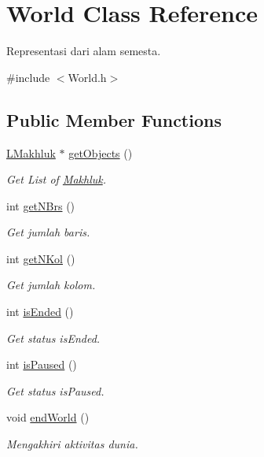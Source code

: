 \hypertarget{class_world}{}\section{World Class Reference}
\label{class_world}


Representasi dari alam semesta.  




{\ttfamily \#include $<$World.\+h$>$}

\subsection*{Public Member Functions}
\begin{DoxyCompactItemize}
\item 
\hyperlink{class_l_makhluk}{L\+Makhluk} $\ast$ \hyperlink{class_world_af9625fa1995e0c3bbdb3e6e7d48effa2}{get\+Objects} ()
\begin{DoxyCompactList}\small\item\em Get List of \hyperlink{class_makhluk}{Makhluk}. \end{DoxyCompactList}\item 
int \hyperlink{class_world_ab77dab54a1e3e7b5657b39f05cb0d2a5}{get\+N\+Brs} ()
\begin{DoxyCompactList}\small\item\em Get jumlah baris. \end{DoxyCompactList}\item 
int \hyperlink{class_world_a2d8ed3b33860324182e773fde59832b2}{get\+N\+Kol} ()
\begin{DoxyCompactList}\small\item\em Get jumlah kolom. \end{DoxyCompactList}\item 
int \hyperlink{class_world_acd627d79b89688184df6e9601ffe1532}{is\+Ended} ()
\begin{DoxyCompactList}\small\item\em Get status is\+Ended. \end{DoxyCompactList}\item 
int \hyperlink{class_world_ad06b05aabbcbe0c93106793bdb5fcc2c}{is\+Paused} ()
\begin{DoxyCompactList}\small\item\em Get status is\+Paused. \end{DoxyCompactList}\item 
void \hyperlink{class_world_a30a87c6071aef420fc2e9df913a7452d}{end\+World} ()
\begin{DoxyCompactList}\small\item\em Mengakhiri aktivitas dunia. \end{DoxyCompactList}\item 

\end{DoxyCompactItemize}
